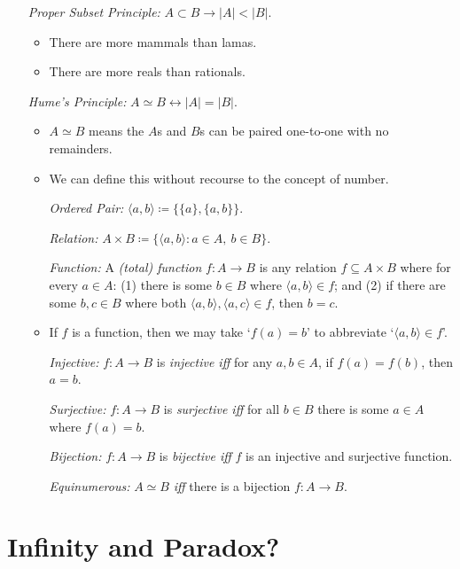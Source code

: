 \documentclass[a4paper, 11pt]{article} %
\newcommand{\tuple}[1]{\langle#1\rangle} %
\newcommand{\set}[1]{\lbrace#1\rbrace} %
\newcommand{\abs}[1]{|#1|} %
\begin{document}
\begin{enumerate}
  \item[\it Proper Subset Principle:] $A\subset B \rightarrow \abs{A}<\abs{B}$.
    \begin{itemize}[leftmargin=-.2in]
      \item There are more mammals than lamas.
      \item There are more reals than rationals.
    \end{itemize}
  \item[\it Hume's Principle:] $A\simeq B \leftrightarrow \abs{A}=\abs{B}$.
    \begin{itemize}[leftmargin=-.2in]
      \item $A\simeq B$ means the $A$s and $B$s can be paired one-to-one with no remainders.
      \item We can define this without recourse to the concept of number.
      \item[\it Ordered Pair:] $\tuple{a,b}\coloneq \set{\set{a},\set{a,b}}$.
      \item[\it Relation:] $A\times B\coloneq \set{\tuple{a,b}:a\in A,\ b\in B}$.
      \item[\it Function:] A \textit{(total) function} $f: A\to B$ is any relation $f\subseteq A\times B$ where for every $a\in A$: (1) there is some $b\in B$ where $\tuple{a,b}\in f$; and (2) if there are some $b,c\in B$ where both $\tuple{a,b},\tuple{a,c}\in f$, then $b=c$. 
      \item If $f$ is a function, then we may take `$f(a)=b$' to abbreviate `$\tuple{a,b}\in f$'. 
      \item[\it Injective:] $f: A\to B$ is \textit{injective iff} for any $a,b\in A$, if $f(a)=f(b)$, then $a=b$. 
      \item[\it Surjective:] $f: A\to B$ is \textit{surjective iff} for all $b\in B$ there is some $a\in A$ where $f(a)=b$.
      \item[\it Bijection:] $f: A\to B$ is \textit{bijective iff} $f$ is an injective and surjective function. 
      \item[\it Equinumerous:] $A\simeq B$ \textit{iff} there is a bijection $f: A \to B$.
    \end{itemize}
\end{enumerate}




\section*{Infinity and Paradox?}
\end{document}
